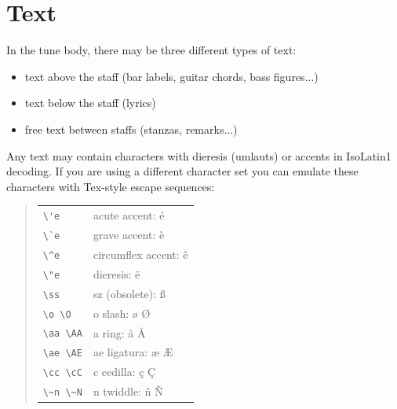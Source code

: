 \documentclass[a4paper]{article}
\begin{document}
\section{Text}
In the tune body, there may be three different types of text:
\begin{itemize}
\item text above the staff (bar labels, guitar chords, bass figures...)
\item text below the staff (lyrics)
\item free text between staffs (stanzas, remarks...)
\end{itemize}
 
Any text may contain characters with dieresis (umlauts) or accents 
in IsoLatin1 decoding. If you are using a different character set
you can emulate these characters with Tex-style escape sequences:
\begin{quote}
\begin{tabular}{ll}
\verb$\'e$ & acute accent: \'e \\
\verb$\`e$ & grave accent: \`e \\
\verb$\^e$ & circumflex accent: \^e \\
\verb$\"e$ & dieresis: \"e \\
\verb$\ss$ & sz (obsolete): \ss \\
\verb$\o \O$ & o slash: {\o} {\O} \\
\verb$\aa \AA$ & a ring: {\aa} {\AA} \\
\verb$\ae \AE$ & ae ligatura: {\ae} {\AE} \\
\verb$\cc \cC$ & c cedilla: \c{c} \c{C} \\
\verb$\~n \~N$ & n twiddle: \~n \~N \\
\end{tabular}
\end{quote}
\end{document}
